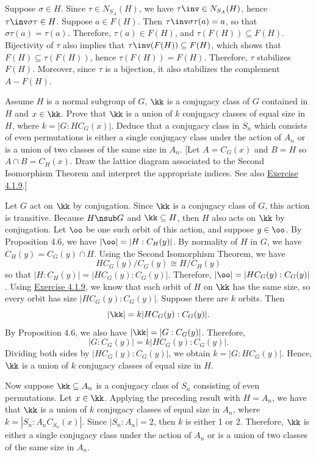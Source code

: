 \begin{sol}
	Suppose $\sigma \in H$. Since $\tau \in N_{S_A}(H)$, we have $\tau\inv \in N_{S_A}(H)$, hence $\tau\inv\sigma\tau \in H$. Suppose $a \in F(H)$. Then $\tau\inv\sigma\tau(a) = a$, so that $\sigma\tau(a) = \tau(a)$. Therefore, $\tau(a) \in F(H)$, and $\tau(F(H)) \subseteq F(H)$. Bijectivity of $\tau$ also implies that $\tau\inv(F(H)) \subseteq F(H)$, which shows that $F(H) \subseteq \tau(F(H))$, hence $\tau(F(H)) = F(H)$. Therefore, $\tau$ stabilizes $F(H)$. Moreover, since $\tau$ is a bijection, it also stabilizes the complement $A - F(H)$.
\end{sol}

\begin{exercise}
	Assume $H$ is a normal subgroup of $G$, $\kk$ is a conjugacy class of $G$ contained in $H$ and $x \in \kk$. Prove that $\kk$ is a union of $k$ conjugacy classes of equal size in $H$, where $k = |G : HC_G(x)|$. Deduce that a conjugacy class in $S_n$ which consists of even permutations is either a single conjugacy class under the action of $A_n$ or is a union of two classes of the same size in $A_n$. [Let $A = C_G(x)$ and $B = H$ so $A \cap B = C_H(x)$. Draw the lattice diagram associated to the Second Isomorphism Theorem and interpret the appropriate indices. See also \hyperref[ex4.1.9]{Exercise 4.1.9}.]
\end{exercise}

\begin{sol}
	Let $G$ act on $\kk$ by conjugation. Since $\kk$ is a conjugacy class of $G$, this action is transitive. Because $H \nsub G$ and $\kk \subseteq H$, then $H$ also acts on $\kk$ by conjugation. Let $\oo$ be one such orbit of this action, and suppose $y \in \oo$. By Proposition 4.6, we have $|\oo| = |H : C_H(y)|$. By normality of $H$ in $G$, we have $C_H(y) = C_G(y) \cap H$. Using the Second Isomorphism Theorem, we have
	\[HC_G(y)/C_G(y) \cong H/C_H(y)\]
	so that $|H : C_H(y)| = |HC_G(y) : C_G(y)|$. Therefore, $|\oo| = |HC_G(y) : C_G(y)|$. Using \hyperref[ex4.1.9]{Exercise 4.1.9}, we know that each orbit of $H$ on $\kk$ has the same size, so every orbit has size $|HC_G(y) : C_G(y)|$. Suppose there are $k$ orbits. Then
	\[|\kk| = k|HC_G(y) : C_G(y)|.\]
	By Proposition 4.6, we also have $|\kk| = |G : C_G(y)|$. Therefore,
	\[|G : C_G(y)| = k|HC_G(y) : C_G(y)|.\]
	Dividing both sides by $|HC_G(y) : C_G(y)|$, we obtain $k = |G : HC_G(y)|$. Hence, $\kk$ is a union of $k$ conjugacy classes of equal size in $H$.

	Now suppose $\kk \subseteq A_n$ is a conjugacy class of $S_n$ consisting of even permutations. Let $x \in \kk$. Applying the preceding result with $H = A_n$, we have that $\kk$ is a union of $k$ conjugacy classes of equal size in $A_n$, where $k = |S_n : A_nC_{S_n}(x)|$. Since $|S_n : A_n| = 2$, then $k$ is either 1 or 2. Therefore, $\kk$ is either a single conjugacy class under the action of $A_n$ or is a union of two classes of the same size in $A_n$.
\end{sol}

